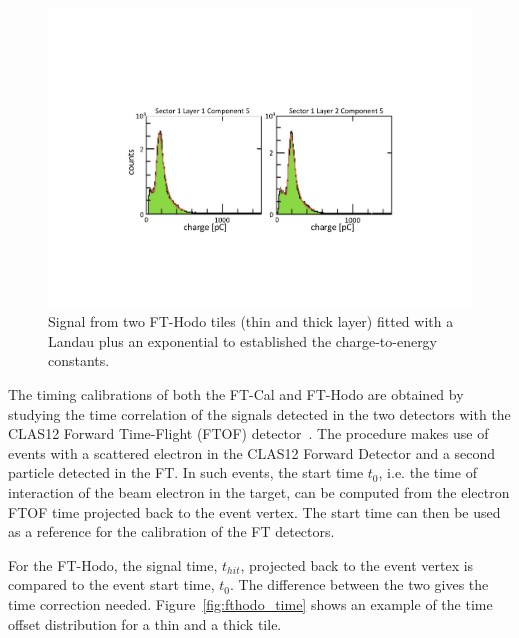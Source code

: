 \begin{figure}
\includegraphics[width=1.0\columnwidth]{fig/fthodo_mips.pdf}
\caption{Signal from two FT-Hodo tiles (thin and thick layer) fitted with a Landau plus an exponential to established
  the charge-to-energy constants.}
\label{fig:fthodo_mips}
\end{figure}

The timing calibrations of both the FT-Cal and FT-Hodo are obtained by studying the time correlation of the signals
detected in the two detectors with the CLAS12 Forward Time-Flight (FTOF) detector~\cite{ftof}. The procedure
makes use of events with a scattered electron in the CLAS12 Forward Detector and a second particle detected in the
FT. In such events, the start time $t_0$, i.e. the time of interaction of the beam electron in the target, can be computed
from the electron FTOF time projected back to the event vertex. The start time can then be used as a reference
for the calibration of the FT detectors. 

For the FT-Hodo, the signal time, $t_{hit}$, projected back to the event vertex is compared to the event start time,
$t_0$. The difference between the two gives the time correction needed. Figure~\ref{fig:fthodo_time} shows an
example of the time offset distribution for a thin and a thick tile.

